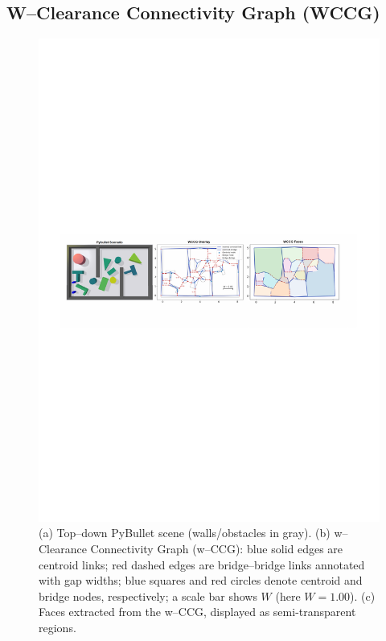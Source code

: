 \subsection{W–Clearance Connectivity Graph (WCCG)}
\label{subsec:wccg}
\begin{figure}
  \centering
  \includegraphics[width=\linewidth]{figures/wccg.pdf}
  \vspace{-4mm}
  \caption{(a) Top–down PyBullet scene (walls/obstacles in gray). 
  (b) w–Clearance Connectivity Graph (w–CCG): blue solid edges are centroid links; red dashed edges are bridge–bridge links annotated with gap widths; blue squares and red circles denote centroid and bridge nodes, respectively; a scale bar shows $W$ (here $W{=}1.00$).
  (c) Faces extracted from the w–CCG, displayed as semi-transparent regions.}
  \label{fig:wccg}
  \vspace{-2mm}
\end{figure}

